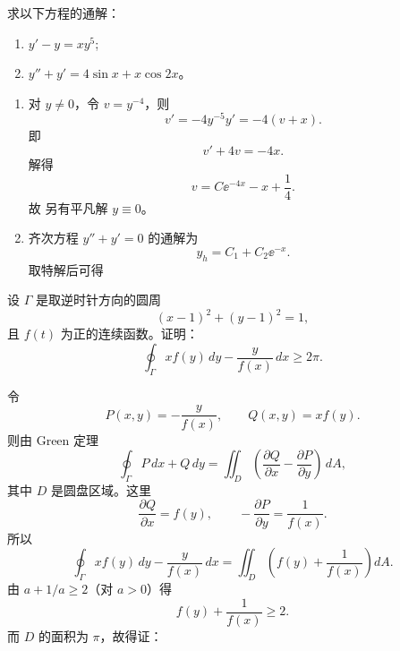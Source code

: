 \begin{question}[微分方程]

求以下方程的通解：
\begin{enumerate}[label=(\arabic*),leftmargin=2.6em,itemsep=0.25em,topsep=0.2em]
\item $y'-y=xy^5$;
\item $y''+y'=4\sin x+x\cos2x$。
\end{enumerate}

\begin{solution}

\begin{enumerate}[label=(\arabic*),leftmargin=2.6em,itemsep=0.25em,topsep=0.2em]
\item 对 $y\ne0$，令 $v=y^{-4}$，则
\[
 v'=-4y^{-5}y'=-4(v+x).
\]
即
\[
 v'+4v=-4x.
\]
解得
\[
 v=C\ee^{-4x}-x+\frac14.
\]
故
另有平凡解 $y\equiv0$。

\item 齐次方程 $y''+y'=0$ 的通解为
\[
 y_h=C_1+C_2\ee^{-x}.
\]
取特解后可得
\end{enumerate}

\end{solution}
\end{question}

\begin{question}

设 $\Gamma$ 是取逆时针方向的圆周
\[
 (x-1)^2+(y-1)^2=1,
\]
且 $f(t)$ 为正的连续函数。证明：
\[
\oint_{\Gamma}x f(y)\,dy-\frac{y}{f(x)}\,dx\ge2\pi.
\]

\begin{solution}

令
\[
 P(x,y)=-\frac{y}{f(x)},\qquad Q(x,y)=xf(y).
\]
则由 Green 定理
\[
\oint_{\Gamma}P\,dx+Q\,dy
=\iint_D\left(\frac{\partial Q}{\partial x}-\frac{\partial P}{\partial y}\right)\,dA,
\]
其中 $D$ 是圆盘区域。这里
\[
 \frac{\partial Q}{\partial x}=f(y),
 \qquad
 -\frac{\partial P}{\partial y}=\frac{1}{f(x)}.
\]
所以
\[
\oint_{\Gamma}x f(y)\,dy-\frac{y}{f(x)}\,dx
=\iint_D\left(f(y)+\frac{1}{f(x)}\right)dA.
\]
由 $a+1/a\ge2$（对 $a>0$）得
\[
 f(y)+\frac{1}{f(x)}\ge2.
\]
而 $D$ 的面积为 $\pi$，故得证：

\end{solution}
\end{question}

